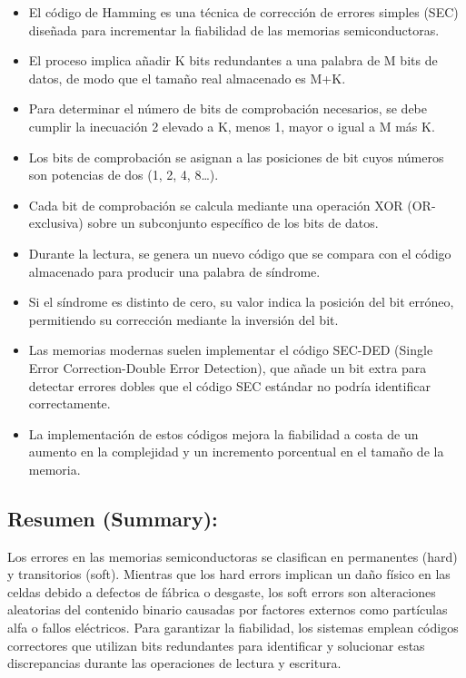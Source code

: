 \documentclass{article}
\begin{document}
\begin{itemize}
\begin{itemize}
\item El sistema realiza cálculos con los datos para producir un
código que se almacena simultáneamente.
\item Durante la lectura, se genera un nuevo código a partir de los
datos captados y se compara con el código guardado.
\item Esta comparación genera una palabra de síndrome que permite
identificar si hubo un error.
\item Dependiendo del código utilizado, el sistema puede no detectar
error, corregir un error detectado o informar de un error no
corregible.
\end{itemize}
\item El código de Hamming es una técnica de corrección de errores simples
(SEC) diseñada para incrementar la fiabilidad de las memorias
semiconductoras.
\item El proceso implica añadir K bits redundantes a una palabra de M bits
de datos, de modo que el tamaño real almacenado es M+K.
\item Para determinar el número de bits de comprobación necesarios, se
debe cumplir la inecuación 2 elevado a K, menos 1, mayor o igual a M
más K.
\item Los bits de comprobación se asignan a las posiciones de bit cuyos
números son potencias de dos (1, 2, 4, 8\ldots{}).
\item Cada bit de comprobación se calcula mediante una operación XOR
(OR-exclusiva) sobre un subconjunto específico de los bits de datos.
\item Durante la lectura, se genera un nuevo código que se compara con el
código almacenado para producir una palabra de síndrome.
\item Si el síndrome es distinto de cero, su valor indica la posición del
bit erróneo, permitiendo su corrección mediante la inversión del
bit.
\item Las memorias modernas suelen implementar el código SEC-DED (Single
Error Correction-Double Error Detection), que añade un bit extra
para detectar errores dobles que el código SEC estándar no podría
identificar correctamente.
\item La implementación de estos códigos mejora la fiabilidad a costa de
un aumento en la complejidad y un incremento porcentual en el tamaño
de la memoria.
\end{itemize}

\subsection{Resumen (Summary):}
\label{sec:orgffc3c2d}
Los errores en las memorias semiconductoras se clasifican en
permanentes (hard) y transitorios (soft). Mientras que los hard errors
implican un daño físico en las celdas debido a defectos de fábrica o
desgaste, los soft errors son alteraciones aleatorias del contenido
binario causadas por factores externos como partículas alfa o fallos
eléctricos. Para garantizar la fiabilidad, los sistemas emplean
códigos correctores que utilizan bits redundantes para identificar y
solucionar estas discrepancias durante las operaciones de lectura y
escritura.
\end{document}
